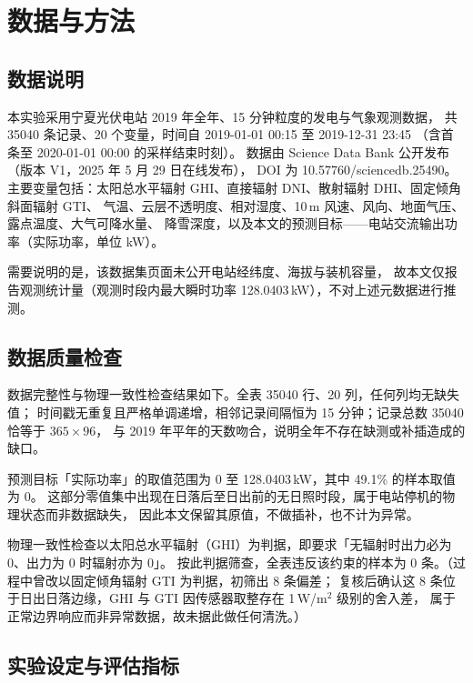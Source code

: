 \documentclass[11pt,a4paper]{ctexart}
\begin{document}
\section{数据与方法}
\subsection{数据说明}
本实验采用宁夏光伏电站 2019 年全年、15 分钟粒度的发电与气象观测数据，
共 35040 条记录、20 个变量，时间自 2019-01-01 00:15 至 2019-12-31 23:45
（含首条至 2020-01-01 00:00 的采样结束时刻）。
数据由 Science Data Bank 公开发布（版本 V1，2025 年 5 月 29 日在线发布）\cite{ningxia2019photovoltaic}，
DOI 为 10.57760/sciencedb.25490。
主要变量包括：太阳总水平辐射 GHI、直接辐射 DNI、散射辐射 DHI、固定倾角斜面辐射 GTI、
气温、云层不透明度、相对湿度、10\,m 风速、风向、地面气压、露点温度、大气可降水量、
降雪深度，以及本文的预测目标——电站交流输出功率（实际功率，单位 kW）。

需要说明的是，该数据集页面未公开电站经纬度、海拔与装机容量，
故本文仅报告观测统计量（观测时段内最大瞬时功率 128.0403\,kW），不对上述元数据进行推测。

\subsection{数据质量检查}

数据完整性与物理一致性检查结果如下。全表 35040 行、20 列，任何列均无缺失值；
时间戳无重复且严格单调递增，相邻记录间隔恒为 15 分钟；记录总数 35040 恰等于 $365 \times 96$，
与 2019 年平年的天数吻合，说明全年不存在缺测或补插造成的缺口。

预测目标「实际功率」的取值范围为 0 至 128.0403\,kW，其中 49.1\% 的样本取值为 0。
这部分零值集中出现在日落后至日出前的无日照时段，属于电站停机的物理状态而非数据缺失，
因此本文保留其原值，不做插补，也不计为异常。

物理一致性检查以太阳总水平辐射（GHI）为判据，即要求「无辐射时出力必为 0、出力为 0 时辐射亦为 0」。
按此判据筛查，全表违反该约束的样本为 0 条。（过程中曾改以固定倾角辐射 GTI 为判据，初筛出 8 条偏差；
复核后确认这 8 条位于日出日落边缘，GHI 与 GTI 因传感器取整存在 1\,W/m$^2$ 级别的舍入差，
属于正常边界响应而非异常数据，故未据此做任何清洗。）

\subsection{实验设定与评估指标}
\end{document}
